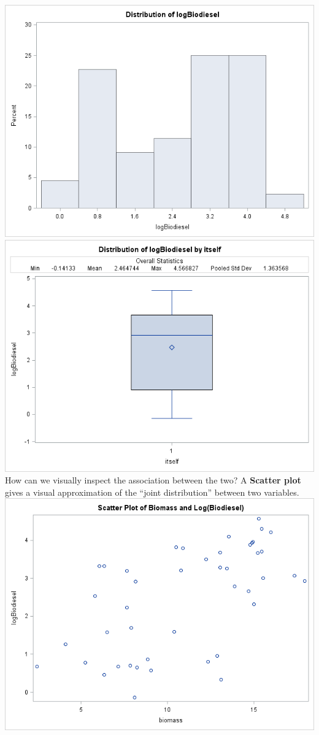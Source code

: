 \includegraphics[scale=0.45]{logbiodieselhist}\includegraphics[scale=0.45]{logbiodieselboxplot}\\

How can we visually inspect the association between the two? A \textbf{Scatter plot} gives a visual approximation of the ``joint distribution'' between two variables.\\
\includegraphics[scale=0.45]{scatterbiomasslogbiodiesel}\\~\\


